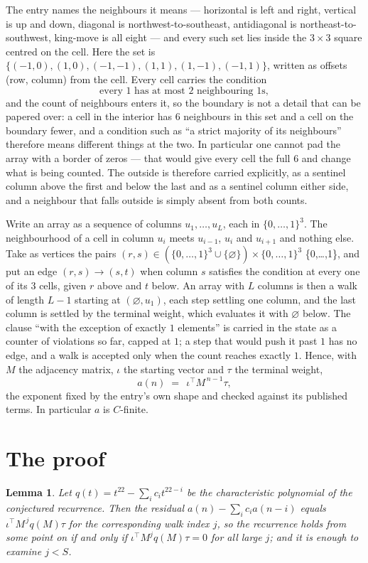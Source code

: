 \documentclass[11pt,a4paper]{article}
\theoremstyle{plain}
\newtheorem{lemma}[theorem]{Lemma}
\theoremstyle{definition}
\begin{document}
The entry names the neighbours it means --- horizontal is left and right, vertical is up and
down, diagonal is northwest-to-southeast, antidiagonal is northeast-to-southwest, king-move is
all eight --- and every such set lies inside the $3\times3$ square centred on the cell. Here
the set is $\{(-1,0), (1,0), (-1,-1), (1,1), (1,-1), (-1,1)\}$, written as offsets (row, column) from the cell. Every cell carries
the condition
\[
\text{every 1 has at most 2 neighbouring 1s},
\]
and the count of neighbours enters it, so the boundary is not a detail that can be papered
over: a cell in the interior has $6$ neighbours in this set and a cell on the boundary
fewer, and a condition such as ``a strict majority of its neighbours'' therefore means
different things at the two. In particular one cannot pad the array with a border of zeros ---
that would give every cell the full $6$ and change what is being counted. The outside is
therefore carried
explicitly, as a sentinel column above the first and below the last and as a sentinel column
either side, and a neighbour that falls outside is simply absent from both counts.

Write an array as a sequence of columns $u_1,\dots,u_L$, each in
$\{0,\dots,1\}^{3}$. The neighbourhood of a cell in column $u_i$ meets $u_{i-1}$,
$u_i$ and $u_{i+1}$ and nothing else. Take as vertices the pairs
$(r,s)\in(\{0,\dots,1\}^{3}\cup\{\varnothing\})\times\{0,\dots,1\}^{3}$ \times \{0,\dots,1\},
and put an edge $(r,s)\to(s,t)$ when column $s$ satisfies the condition at every one of its
$3$ cells, given $r$ above and $t$ below. An array with $L$ columns is then a walk of length
$L-1$ starting at $(\varnothing,u_1)$, each step settling one column, and the last column is
settled by the terminal weight, which evaluates it with $\varnothing$ below. The clause ``with the exception of exactly $1$ elements'' is carried in
the state as a counter of violations so far, capped at $1$; a step that would push it past
$1$ has no edge, and a walk is accepted only when the count reaches exactly $1$. Hence,
with $M$ the adjacency matrix, $\iota$ the starting vector and $\tau$ the terminal weight,
\[
a(n)\;=\;\,\iota^{\!\top}M^{\,n-1}\tau ,
\]
the exponent fixed by the entry's own shape and checked against its published terms. In
particular $a$ is $C$-finite.

\section{The proof}

\begin{lemma}\label{lem:crit}
Let $q(t)=t^{22}-\sum_i c_it^{22-i}$ be the characteristic polynomial of the
conjectured recurrence. Then the residual $a(n)-\sum_ic_ia(n-i)$ equals
$\iota^{\!\top}M^{\,j}q(M)\tau$ for the corresponding walk index $j$, so the
recurrence holds from some point on if and only if $\iota^{\!\top}M^{j}q(M)\tau=0$ for all
large $j$; and it is enough to examine $j<S$.
\end{lemma}
\end{document}
